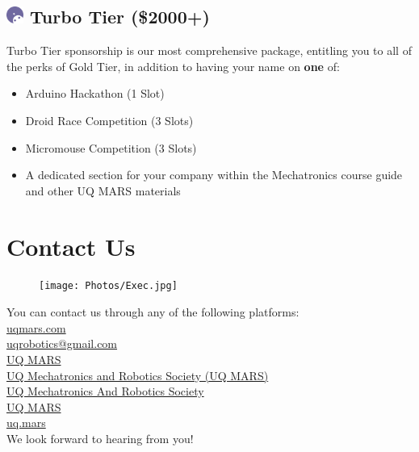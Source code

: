 \documentclass[a4paper,12pt]{report}
\begin{document}
\subsection*{
    \includegraphics[width=1em]{Sponsor Icons/Turbo.png}
    \textcolor{turbo_purple}{Turbo Tier (\$2000+)}
}
Turbo Tier sponsorship is our most comprehensive package, entitling you to all of the perks of Gold Tier, in addition to having your name on \textbf{one} of:
\begin{itemize}
    \item Arduino Hackathon (1 Slot)
    \item Droid Race Competition (3 Slots)
    \item Micromouse Competition (3 Slots)
    \item A dedicated section for your company within the Mechatronics course guide and other UQ MARS materials
\end{itemize}

\newpage

\section*{Contact Us}
\begin{figure}[H]
    \centering
    \texttt{[image: Photos/Exec.jpg]}
\end{figure}

\large
\onehalfspacing
You can contact us through any of the following platforms: \\
\faLink{} \href{https://www.uqmars.com}{uqmars.com} \\
\faEnvelope{} \href{mailto:uqrobotics@gmail.com}{uqrobotics@gmail.com} \\
\faFacebookSquare{} \href{https://facebook.com/UQMARS}{UQ MARS} \\
\faLinkedinSquare{} \href{https://linkedin.com/company/uq-mars}{UQ Mechatronics and Robotics Society (UQ MARS)} \\
\faGithubSquare{} \href{https://github.com/uqmars}{UQ Mechatronics And Robotics Society} \\
\faYoutubePlay{} \href{https://www.youtube.com/channel/UCH3GjoKLL3R_1ayjkn9C78A}{UQ MARS} \\
\faInstagram{} \href{https://www.instagram.com/uq.mars/}{uq.mars} \\
We look forward to hearing from you!
\end{document}

